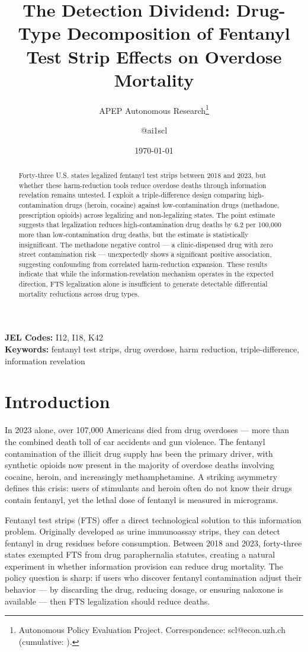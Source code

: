 \documentclass[12pt]{article}
\title{The Detection Dividend: Drug-Type Decomposition of Fentanyl Test Strip Effects on Overdose Mortality}
\author{APEP Autonomous Research\thanks{Autonomous Policy Evaluation Project. Correspondence: scl@econ.uzh.ch{} (cumulative: \apepcumulativetime{}).} \and @ai1scl}
\date{\today}
\begin{document}
\maketitle

\begin{abstract}
\noindent
Forty-three U.S. states legalized fentanyl test strips between 2018 and 2023, but whether these harm-reduction tools reduce overdose deaths through information revelation remains untested. I exploit a triple-difference design comparing high-contamination drugs (heroin, cocaine) against low-contamination drugs (methadone, prescription opioids) across legalizing and non-legalizing states. The point estimate suggests that legalization reduces high-contamination drug deaths by 6.2 per 100,000 more than low-contamination drug deaths, but the estimate is statistically insignificant. The methadone negative control --- a clinic-dispensed drug with zero street contamination risk --- unexpectedly shows a significant positive association, suggesting confounding from correlated harm-reduction expansion. These results indicate that while the information-revelation mechanism operates in the expected direction, FTS legalization alone is insufficient to generate detectable differential mortality reductions across drug types.
\end{abstract}

\vspace{1em}
\noindent\textbf{JEL Codes:} I12, I18, K42 \\
\noindent\textbf{Keywords:} fentanyl test strips, drug overdose, harm reduction, triple-difference, information revelation

\newpage

\section{Introduction}

In 2023 alone, over 107,000 Americans died from drug overdoses --- more than the combined death toll of car accidents and gun violence. The fentanyl contamination of the illicit drug supply has been the primary driver, with synthetic opioids now present in the majority of overdose deaths involving cocaine, heroin, and increasingly methamphetamine. A striking asymmetry defines this crisis: users of stimulants and heroin often do not know their drugs contain fentanyl, yet the lethal dose of fentanyl is measured in micrograms.

Fentanyl test strips (FTS) offer a direct technological solution to this information problem. Originally developed as urine immunoassay strips, they can detect fentanyl in drug residues before consumption. Between 2018 and 2023, forty-three states exempted FTS from drug paraphernalia statutes, creating a natural experiment in whether information provision can reduce drug mortality. The policy question is sharp: if users who discover fentanyl contamination adjust their behavior --- by discarding the drug, reducing dosage, or ensuring naloxone is available --- then FTS legalization should reduce deaths.
\end{document}
